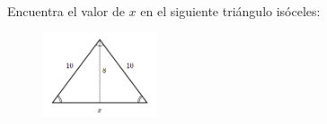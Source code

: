 Encuentra el valor de $x$ en el siguiente triángulo isóceles:
\begin{figure}[H]
    \begin{center}
        \includegraphics[width=0.3\textwidth]{../images/pitagoras6.png}
    \end{center}
    \caption{}
    \label{fig:pitagoras6}
\end{figure}

